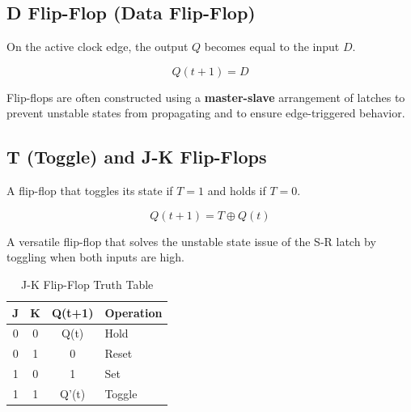 \subsection{D Flip-Flop (Data Flip-Flop)}

On the active clock edge, the output $Q$ becomes equal to the input $D$.

\begin{proposition}
\begin{equation}
    Q(t+1) = D
\end{equation}
\end{proposition}

\begin{remark}
Flip-flops are often constructed using a \textbf{master-slave} arrangement of latches to prevent unstable states from propagating and to ensure edge-triggered behavior.
\end{remark}

\subsection{T (Toggle) and J-K Flip-Flops}

\begin{vocabulary}
A flip-flop that toggles its state if $T=1$ and holds if $T=0$.
\end{vocabulary}

\begin{proposition}
\begin{equation}
    Q(t+1) = T \oplus Q(t)
\end{equation}
\end{proposition}

\begin{vocabulary}
A versatile flip-flop that solves the unstable state issue of the S-R latch by toggling when both inputs are high.
\end{vocabulary}

\begin{table}[h]
\centering
\begin{center}
\begin{tabular}{cccl}
\toprule
\textbf{J} & \textbf{K} & \textbf{Q(t+1)} & \textbf{Operation} \\
\midrule
0 & 0 & Q(t) & Hold \\
0 & 1 & 0 & Reset \\
1 & 0 & 1 & Set \\
1 & 1 & Q'(t) & Toggle \\
\bottomrule
\end{tabular}
\end{center}
\caption{J-K Flip-Flop Truth Table}
\end{table}

